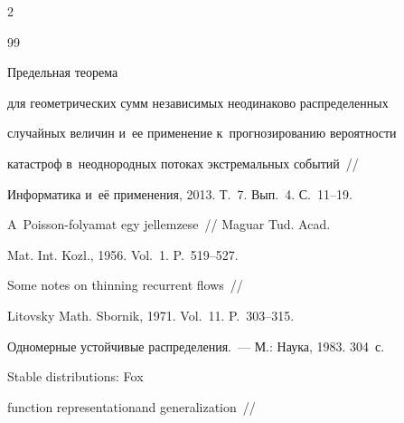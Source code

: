 \begin{multicols}{2}








{\small\frenchspacing


 {%




 \begin{thebibliography}{99}


    




 Предель\-ная теорема


    для геометрических сумм неза\-ви\-симых неодинаково распределенных


    случайных ве\-личин и~ее применение к~прогнозированию вероятности


    катастроф в~неоднородных потоках экстремальных событий~//


    Информатика и~её применения, 2013. Т.~7. Вып.~4. С.~11--19.


    




 A~Poisson-folyamat egy jellemzese~// Maguar Tud. Acad.


    Mat. Int. Kozl., 1956. Vol.~1. P.~519--527.


    




 Some notes on thinning recurrent flows~// 


Litovsky Math. Sbornik, 1971. Vol.~11. P.~303--315.


    




 Одномерные устойчивые распределения.~--- М.: Наука, 1983. 304~с.


    




 Stable distributions: Fox


    function representationand generalization~// 



\end{thebibliography}}}
\end{multicols}
